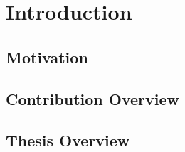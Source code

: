\doublespacing
\chapter{Introduction}\label{chap:intro}
\section{Motivation} \label{sec:motivation}
\section{Contribution Overview}

\section{Thesis Overview}
